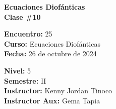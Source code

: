 \begin{center} \textbf
{
    \Large Ecuaciones Diofánticas \\ \vspace{2mm}Clase \#10
}
\end{center}

\begin{multicols}{2}
{
    \textbf{Encuentro:} 25\\
    \textbf{Curso:} Ecuaciones Diofánticas\\
    \textbf{Fecha:} 26 de octubre de 2024\\
    \begin{flushright}
        \textbf{Nivel:} 5\\
        \textbf{Semestre:} II\\
        \textbf{Instructor:} Kenny Jordan Tinoco\\
        \textbf{Instructor Aux:} Gema Tapia
    \end{flushright}
}
\end{multicols}

\thispagestyle{first-page-style}
